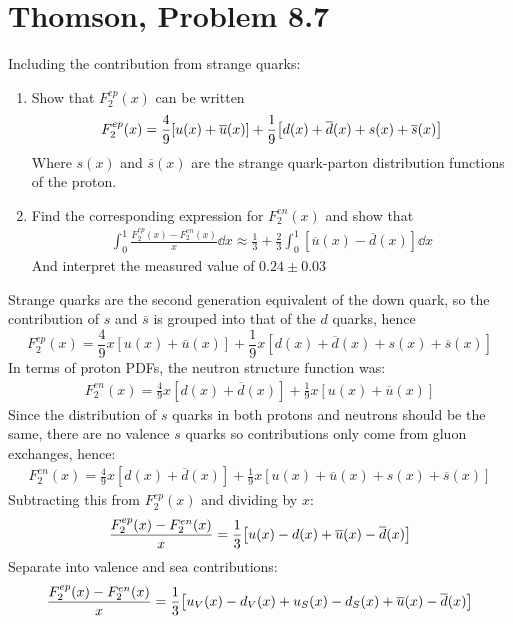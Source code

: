 \documentclass[12pt]{article}
\renewcommand{\bar}{\overline}
\begin{document}
\section{Thomson, Problem 8.7}
\begin{problem}
  Including the contribution from strange quarks:
  \begin{enumerate}[label = (\alph*)]
  \item Show that $F_2^{ep}(x)$ can be written
    \begin{align*}
      F_2^{ep}(x)=
      \frac49\qty[u(x)+\bar{u}(x)]+
      \frac19\qty[d(x)+\bar{d}(x)+s(x)+\bar{s}(x)]
    \end{align*}
    Where $s(x)$ and $\bar{s}(x)$ are the strange quark-parton distribution functions of the proton.
  \item Find the corresponding expression for $F_2^{en}(x)$ and show that
    \begin{align*}
      \int_0^1\frac{F_2^{ep}(x)-F_2^{en}(x)}{x}\dd{x}
      \approx\frac13+\frac23\int_0^1[\bar{u}(x)-\bar{d}(x)]\dd{x}
    \end{align*}
    And interpret the measured value of $0.24\pm0.03$
  \end{enumerate}
\end{problem}
Strange quarks are the second generation equivalent of the down quark, so the contribution of $s$ and $\bar{s}$ is grouped into that of the $d$ quarks, hence
\begin{equation}
  \label{eq:p7a}
  \boxed{F^{ep}_2(x)=
    \frac49x[u(x)+\bar{u}(x)]+
    \frac19x[d(x)+\bar{d}(x)+s(x)+\bar{s}(x)]
  }
\end{equation}
In terms of proton PDFs, the neutron structure function was:
\begin{align*}
  F^{en}_2(x)=
  \frac49x[d(x)+\bar{d}(x)]+
  \frac19x[u(x)+\bar{u}(x)]
\end{align*}
Since the distribution of $s$ quarks in both protons and neutrons should be the same, there are no valence $s$ quarks so contributions only come from gluon exchanges, hence:
\begin{align*}
  F^{en}_2(x)=
  \frac49x[d(x)+\bar{d}(x)]+
  \frac19x[u(x)+\bar{u}(x)+s(x)+\bar{s}(x)]
\end{align*}
Subtracting this from $F_2^{ep}(x)$ and dividing by $x$:
\begin{align*}
  \frac{F^{ep}_2(x)-F^{en}_2(x)}{x}=
  \frac13\qty[u(x)-d(x)+\bar{u}(x)-\bar{d}(x)]
\end{align*}
Separate into valence and sea contributions:
\begin{align*}
  \frac{F^{ep}_2(x)-F^{en}_2(x)}{x}=
  \frac13\qty[u_V(x)-d_V(x)+u_S(x)-d_S(x)+\bar{u}(x)-\bar{d}(x)]
\end{align*}
\end{document}
